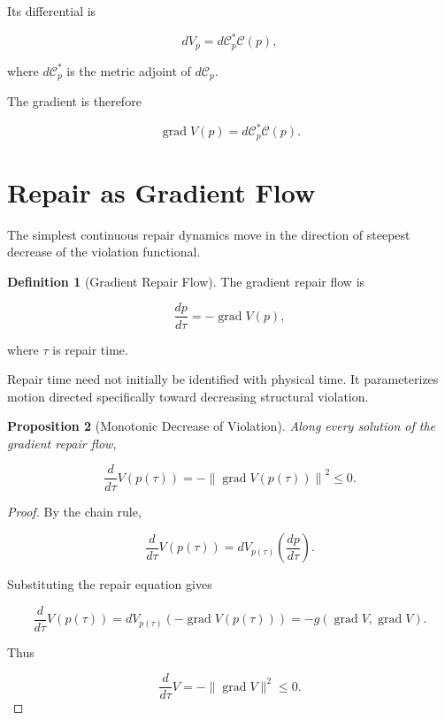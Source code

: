 \documentclass[11pt,oneside]{book}
\numberwithin{equation}{chapter}
\theoremstyle{definition}
\newtheorem{definition}{Definition}[chapter]
\theoremstyle{plain}
\newtheorem{proposition}[definition]{Proposition}
\DeclareMathOperator{\grad}{grad}
\begin{document}
Its differential is

\[
dV_p
=
d\mathcal C_p^{*}
\mathcal C(p),
\]

where \(d\mathcal C_p^{*}\) is the metric adjoint of
\(d\mathcal C_p\).

The gradient is therefore

\[
\grad V(p)
=
d\mathcal C_p^{*}\mathcal C(p).
\]

\section{Repair as Gradient Flow}

The simplest continuous repair dynamics move in the direction of steepest
decrease of the violation functional.

\begin{definition}[Gradient Repair Flow]

The gradient repair flow is

\[
\boxed{
\frac{dp}{d\tau}
=
-\grad V(p),
}
\]

where \(\tau\) is repair time.

\end{definition}

Repair time need not initially be identified with physical time. It
parameterizes motion directed specifically toward decreasing structural
violation.

\begin{proposition}[Monotonic Decrease of Violation]

Along every solution of the gradient repair flow,

\[
\frac{d}{d\tau}V(p(\tau))
=
-
\left\|
\grad V(p(\tau))
\right\|^2
\leq 0.
\]

\end{proposition}

\begin{proof}

By the chain rule,

\[
\frac{d}{d\tau}V(p(\tau))
=
dV_{p(\tau)}
\left(
\frac{dp}{d\tau}
\right).
\]

Substituting the repair equation gives

\[
\frac{d}{d\tau}V(p(\tau))
=
dV_{p(\tau)}
\left(
-\grad V(p(\tau))
\right)
=
-
g
\left(
\grad V,
\grad V
\right).
\]

Thus

\[
\frac{d}{d\tau}V
=
-
\|\grad V\|^2
\leq 0.
\]

\end{proof}
\end{document}
